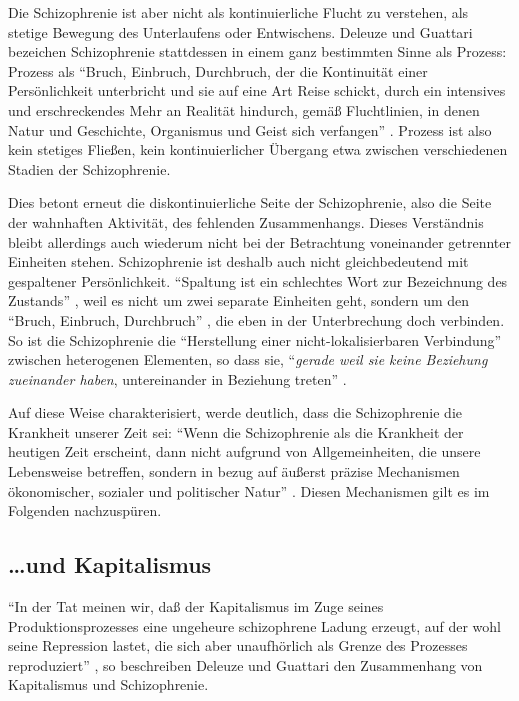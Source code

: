 \documentclass[12pt,
               DIV13,
               paper=a4,
               twoside=false,
               onehalfspacing,
               bibliography=totoc,
               toc=graduated,
               draft,
               ]{scrartcl}
\newcommand{\pc}[2]{\parencite[#1]{#2}}
\newcommand{\dg}{Deleuze und Guattari\xspace}
\begin{document}
Die Schizophrenie ist aber nicht als kontinuierliche Flucht zu
verstehen, als stetige Bewegung des Unterlaufens oder Entwischens. \dg
bezeichen Schizophrenie stattdessen in einem ganz bestimmten Sinne als
Prozess: Prozess als "`Bruch, Einbruch, Durchbruch, der die Kontinuität einer
Persönlichkeit unterbricht und sie auf eine Art Reise schickt, durch
ein intensives und erschreckendes \glq Mehr an Realität\grq{}
hindurch, gemäß Fluchtlinien, in denen Natur und Geschichte,
Organismus und Geist sich verfangen"' \pc{28}{schizg}. Prozess ist
also kein stetiges Fließen, kein kontinuierlicher Übergang etwa
zwischen verschiedenen Stadien der Schizophrenie.

Dies betont erneut die diskontinuierliche Seite der Schizophrenie,
also die Seite der wahnhaften Aktivität, des fehlenden Zusammenhangs.
Dieses Verständnis bleibt allerdings auch wiederum nicht bei der
Betrachtung voneinander getrennter Einheiten stehen. Schizophrenie ist
deshalb auch nicht gleichbedeutend mit gespaltener Persönlichkeit.
"`Spaltung ist ein schlechtes Wort zur Bezeichnung des Zustands"'
\pc{27}{schizg}, weil es nicht um zwei separate Einheiten geht,
sondern um den "`Bruch, Einbruch, Durchbruch"' \pc{28}{schizg}, die
eben in der Unterbrechung doch verbinden. So ist die Schizophrenie die
"`Herstellung einer nicht-lokalisierbaren Verbindung"' \pc{19}{schizg}
zwischen heterogenen Elementen, so dass sie, "`\emph{gerade weil sie
keine Beziehung zueinander haben}, untereinander in Beziehung treten"'
\pc{S. 19, Hervorh. im Orig.}{schizg}.

Auf diese Weise charakterisiert, werde deutlich, dass die
Schizophrenie die Krankheit unserer Zeit sei: "`Wenn die Schizophrenie
als die Krankheit der heutigen Zeit erscheint, dann nicht aufgrund von
Allgemeinheiten, die unsere Lebensweise betreffen, sondern in bezug
auf äußerst präzise Mechanismen ökonomischer, sozialer und politischer
Natur"' \pc{28}{schizg}. Diesen Mechanismen gilt es im Folgenden
nachzuspüren.



\subsection{\dots und Kapitalismus}

"`In der Tat meinen wir, daß der Kapitalismus im Zuge seines
Produktionsprozesses eine ungeheure schizophrene Ladung erzeugt, auf
der wohl seine Repression lastet, die sich aber unaufhörlich als
Grenze des Prozesses reproduziert"' \pc{45}{ao}, so beschreiben
Deleuze und Guattari den Zusammenhang von Kapitalismus und
Schizophrenie.
\end{document}
